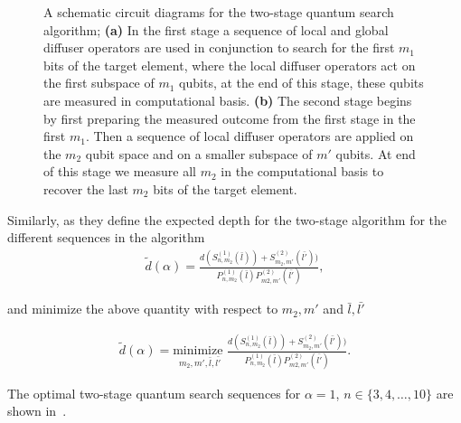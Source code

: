 \begin{figure}[t!]
{{
	}
	}
	\caption[A schematic circuit diagrams for the two-stage quantum search algorithm.]{A schematic circuit diagrams for the two-stage quantum search algorithm; \textbf{(a)} In the first stage a sequence of local and global diffuser operators are used in conjunction to search for the first $m_1$ bits of the target element, where the local diffuser operators act on the first subspace of $m_1$ qubits, at the end of this stage, these qubits are measured in computational basis. \textbf{(b)} The second stage begins by first preparing the measured outcome from the first stage in the first $m_1$. Then a sequence of local diffuser operators are applied on the $m_2$ qubit space and on a smaller subspace of $m'$ qubits. At end of this stage we measure all $m_2$ in the computational basis to recover the last $m_2$ bits of the target element.} 
\end{figure}


\noindent
Similarly, as they define the expected depth for the two-stage algorithm for the different sequences in the algorithm
\begin{align}
	\tilde{d}(\alpha) = \frac{d(S^{(1)}_{n,m_2}(\bar{l})) + S^{(2)}_{m_2,m'}(\bar{l'}))}{P_{n,m_2}^{(1)}(\bar{l})P_{m2, m'}^{(2)}(\bar{l'})},
\end{align}

\noindent
and minimize the above quantity with respect to $m_2, m'$ and $\bar{l},\bar{l'}$

\begin{align}
	\tilde{d}(\alpha) = \underset{m_2,m',\bar{l},\bar{l'}}{\text{minimize }}\frac{d(S^{(1)}_{n,m_2}(\bar{l})) + S^{(2)}_{m_2,m'}(\bar{l'}))}{P_{n,m_2}^{(1)}(\bar{l})P_{m2, m'}^{(2)}(\bar{l'})}.
\end{align}

\noindent
The optimal two-stage quantum search sequences for $\alpha=1$, $n \in \{3,4,\ldots, 10\}$ are shown in~. 


